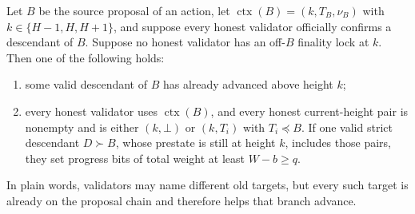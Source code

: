 \begin{lemma}
\label{lem:common-progress}
Let \(B\) be the source proposal of an action, let
\(\operatorname{ctx}(B)=(k,T_B,\nu_B)\) with
\(k\in\{H-1,H,H+1\}\), and suppose every honest validator officially confirms
a descendant of \(B\).  Suppose no honest validator has an off-\(B\) finality
lock at \(k\).  Then one of the following holds:
\begin{enumerate}
 \item some valid descendant of \(B\) has already advanced above height \(k\);
 \item every honest validator uses \(\operatorname{ctx}(B)\), and every honest
 current-height pair is nonempty and is either \((k,\bot)\) or
 \((k,T_i)\) with \(T_i\preceq B\).  If one valid strict descendant
\(D\succ B\),
 whose prestate is still at height \(k\), includes those pairs, they set
 progress bits of total weight at least \(W-b\geq q\).
\end{enumerate}

In plain words, validators may name different old targets, but every such
target is already on the proposal chain and therefore helps that branch
advance.
\end{lemma}

